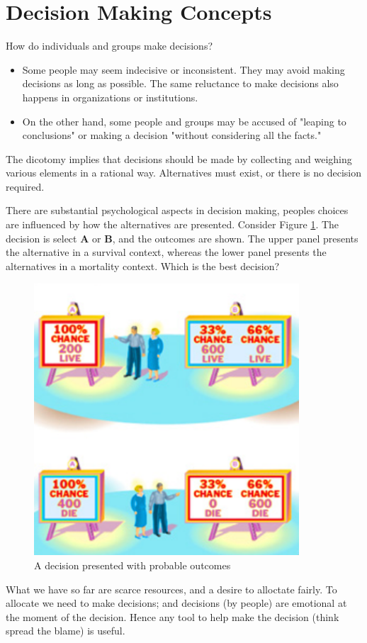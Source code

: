 \documentclass[11pt]{article}
\begin{document}
\section{Decision Making Concepts}
How do individuals and groups make decisions?
\begin{itemize}
\item Some people may seem indecisive or inconsistent. They may avoid making decisions as
long as possible. The same reluctance to make decisions also happens in organizations or
institutions.
\item On the other hand, some people and groups may be accused of "leaping to conclusions"
or making a decision "without considering all the facts."
\end{itemize}
The dicotomy implies that decisions should be made by collecting and weighing various elements in
a rational way. Alternatives must exist, or there is no decision required.

There are substantial psychological aspects in decision making, peoples choices are influenced by how the alternatives are presented.
Consider Figure \ref{fig:probability-decision}.  
The decision is select \textbf{A} or \textbf{B}, and the outcomes are shown.
The upper panel presents the alternative in a survival context, whereas the lower panel presents the alternatives in a mortality context.
Which is the best decision?
\begin{figure}[h!]%
   \centering
   \includegraphics[height=4in]{./figures/probability-decision.png} 
   \caption{A decision presented with probable outcomes}
   \label{fig:probability-decision}
\end{figure}
What we have so far are scarce resources, and a desire to alloctate fairly.
To allocate we need to make decisions; and decisions (by people) are emotional at the
moment of the decision.
Hence any tool to help make the decision (think spread the blame) is useful.
\end{document}
